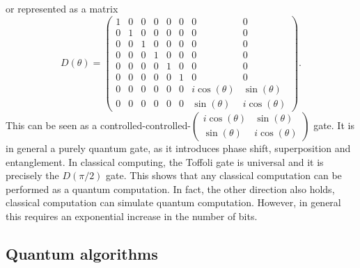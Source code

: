 \documentclass[a4paper,10pt,oneside]{book}
\theoremstyle{plain}
\theoremstyle{definition}
\theoremstyle{remark}
\begin{document}
or represented as a matrix
\begin{equation}
  D(\theta) =
  \begin{pmatrix}
    1 & 0 & 0 & 0 & 0 & 0 & 0 & 0 \\
    0 & 1 & 0 & 0 & 0 & 0 & 0 & 0 \\
    0 & 0 & 1 & 0 & 0 & 0 & 0 & 0 \\
    0 & 0 & 0 & 1 & 0 & 0 & 0 & 0 \\
    0 & 0 & 0 & 0 & 1 & 0 & 0 & 0 \\
    0 & 0 & 0 & 0 & 0 & 1 & 0 & 0 \\
    0 & 0 & 0 & 0 & 0 & 0 & i\cos(\theta) & \sin(\theta) \\
    0 & 0 & 0 & 0 & 0 & 0 & \sin(\theta) & i\cos(\theta)
  \end{pmatrix}.
\end{equation}
This can be seen as a controlled-controlled-$\begin{pmatrix}i\cos(\theta)&\sin(\theta)\\\sin(\theta)&i\cos(\theta)\end{pmatrix}$ gate. It is in general a purely quantum gate, as it introduces phase shift, superposition and entanglement. In classical computing, the Toffoli gate is universal and it is precisely the $D(\pi/2)$ gate. This shows that any classical computation can be performed as a quantum computation. In fact, the other direction also holds, classical computation can simulate quantum computation. However, in general this requires an exponential increase in the number of bits.

\subsection{Quantum algorithms}
\end{document}
